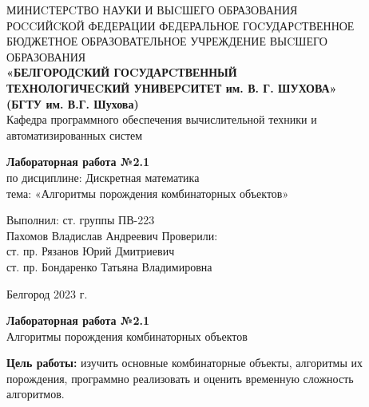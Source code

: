 \documentclass[a4paper,14pt]{extarticle}
\newcommand\textbox[1]{
	\parbox{.45\textwidth}{#1}
}
\begin{document}
	
	\begin{center}
		\small{
			МИНИCТЕРCТВО НАУКИ И ВЫCШЕГО ОБРАЗОВАНИЯ \\РОCCИЙCКОЙ ФЕДЕРАЦИИ
			\bigbreak
			ФЕДЕРАЛЬНОЕ ГОCУДАРCТВЕННОЕ БЮДЖЕТНОЕ ОБРАЗОВАТЕЛЬНОЕ УЧРЕЖДЕНИЕ ВЫCШЕГО ОБРАЗОВАНИЯ \\
			\bigbreak
			\textbf{«БЕЛГОРОДCКИЙ ГОCУДАРCТВЕННЫЙ \\ТЕХНОЛОГИЧЕCКИЙ УНИВЕРCИТЕТ им. В. Г. ШУХОВА»\\ (БГТУ им. В.Г. Шухова)} \\
			\bigbreak
			Кафедра программного обеспечения вычислительной техники и автоматизированных систем\\}
	\end{center}
	
	\vfill
	\begin{center}
		\large{
			\textbf{
				Лабораторная работа №2.1}}\\
		\normalsize{
			по дисциплине: Дискретная математика \\
			тема: «Алгоритмы порождения комбинаторных объектов»}
	\end{center}
	\vfill
	\hfill\textbox{
		Выполнил: ст. группы ПВ-223\\Пахомов Владислав Андреевич
		\bigbreak
		Проверили: \\ст. пр. Рязанов Юрий Дмитриевич\\
		ст. пр. Бондаренко Татьяна Владимировна
	}
	\vfill\begin{center}
		Белгород 2023 г.
	\end{center}
	\newpage
	\begin{center}
		\textbf{Лабораторная работа №2.1}\\
		Алгоритмы порождения комбинаторных объектов
	\end{center}
	\textbf{Цель работы: }изучить основные комбинаторные объекты, алгоритмы их порождения, программно реализовать и оценить временную сложность алгоритмов.
\end{document}
